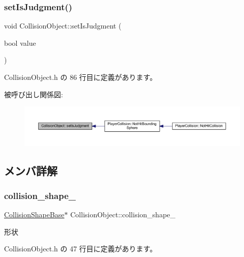 \subsubsection{\texorpdfstring{set\+Is\+Judgment()}{setIsJudgment()}}
{\footnotesize\ttfamily void Collision\+Object\+::set\+Is\+Judgment (\begin{DoxyParamCaption}\item[{bool}]{value }\end{DoxyParamCaption})\hspace{0.3cm}{\ttfamily [inline]}}



 Collision\+Object.\+h の 86 行目に定義があります。

被呼び出し関係図\+:\nopagebreak
\begin{figure}[H]
\begin{center}
\leavevmode
\includegraphics[width=350pt]{class_collision_object_a3000144caea71e39cbdafebb249fef7e_icgraph}
\end{center}
\end{figure}


\subsection{メンバ詳解}
\mbox{\label{class_collision_object_a4ed81be0cf60ec47e54f83955853a6b1}} 
\subsubsection{\texorpdfstring{collision\+\_\+shape\+\_\+}{collision\_shape\_}}
{\footnotesize\ttfamily \mbox{\hyperlink{class_collision_shape_base}{Collision\+Shape\+Base}}$\ast$ Collision\+Object\+::collision\+\_\+shape\+\_\+\hspace{0.3cm}{\ttfamily [private]}}



形状 



 Collision\+Object.\+h の 47 行目に定義があります。

